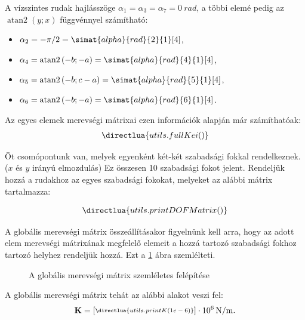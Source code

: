 \documentclass[a4paper, 12pt]{scrartcl}
\newcommand{\rmat}[1]{\mathbf{#1}}
\DeclareMathOperator\atann{atan2}
\begin{document}
A vízszintes rudak hajlásszöge $\alpha_1 = \alpha_3 = \alpha_7 = \SI{0}{rad}$,
a többi elemé pedig az $\atann(y; x)$ függvénnyel számítható:
\begin{multicols}{2}
  \begin{itemize}
    \item $\a_2 = -\pi/2 = \simat{alpha}{rad}{2}{1}[4]$,
    \item $\a_4 = \atann \left( -b; -a \right) = \simat{alpha}{rad}{4}{1}[4]$,
    \item $\a_5 = \atann \left( -b; c-a \right) = \simat{alpha}{rad}{5}{1}[4]$,
    \item $\a_6 = \atann \left( -b; -a \right) = \simat{alpha}{rad}{6}{1}[4]$.
  \end{itemize}
\end{multicols}

Az egyes elemek merevségi mátrixai ezen információk alapján már számíthatóak:
\begin{equation}
  \sisetup{
    exponent-mode = fixed,
    round-precision = 4
  }
  \begin{split}
    \directlua{utils.fullKei()}
  \end{split}
\end{equation}

Öt csomópontunk van, melyek egyenként két-két szabadsági fokkal rendelkeznek.
($x$ és $y$ irányú elmozdulás) Ez összesen 10 szabadsági fokot jelent.
Rendeljük hozzá a rudakhoz az egyes szabadsági fokokat, melyeket az alábbi
mátrix tartalmazza:

\begin{equation}
  \directlua{utils.printDOFMatrix()}
  \label{eq:DOF}
\end{equation}

A globális merevségi mátrix összeállításakor figyelnünk kell arra, hogy az adott
elem merevségi mátrixának megfelelő elemeit a hozzá tartozó szabadsági fokhoz
tartozó helyhez rendeljük hozzá. Ezt a \ref{fig:table} ábra szemlélteti.
\begin{figure}[H]
  \centering
  
  \caption{A globális merevségi mátrix szemléletes felépítése}
  \label{fig:table}
\end{figure}

A globális merevségi mátrix tehát az alábbi alakot veszi fel:
\begin{equation}
  \sisetup{
    exponent-mode = fixed,
    round-precision = 5
  }
  \scriptsize{
    \rmat K = \begin{bmatrix}
      \directlua{utils.printK(1e-6)}
    \end{bmatrix} \cdot 10^6 \, \mathrm{N/m}
  }.
  \normalsize
  \label{eq:K}
\end{equation}
\end{document}
